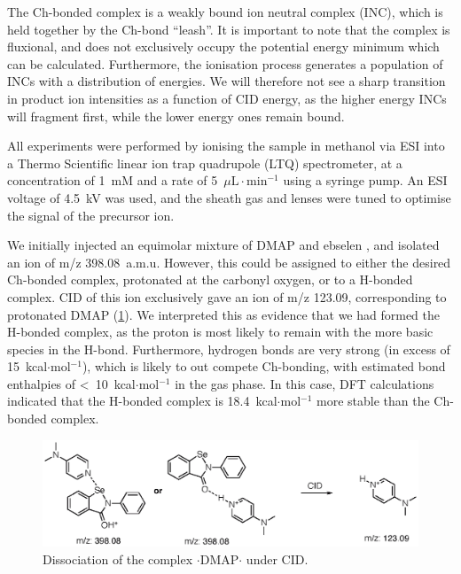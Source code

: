 \begin{refsection}
The Ch-bonded complex is a weakly bound ion neutral complex (INC), which is held together by the Ch-bond ``leash''.\autocite{McAdoo1993}
It is important to note that the complex is fluxional, and does not exclusively occupy the potential energy minimum which can be calculated.
Furthermore, the ionisation process generates a population of INCs with a distribution of energies.
We will therefore not see a sharp transition in product ion intensities as a function of CID energy, as the higher energy INCs will fragment first, while the lower energy ones remain bound.

All experiments were performed by ionising the sample in methanol via ESI into a Thermo Scientific linear ion trap quadrupole (LTQ) spectrometer, at a concentration of 1~m\textsc{M} and a rate of 5~$\mu\text{L}\cdot\text{min}^{-1}$ using a syringe pump.
An ESI voltage of 4.5~kV was used, and the sheath gas and lenses were tuned to optimise the signal of the precursor ion.

We initially injected an equimolar mixture of DMAP and ebselen , and isolated an ion of m/z 398.08~a.m.u.
However, this could be assigned to either the desired Ch-bonded complex, protonated at the carbonyl oxygen, or to a H-bonded complex.
CID of this ion exclusively gave an ion of m/z 123.09, corresponding to protonated DMAP (\cref{fig:pos-esi-ms}).
We interpreted this as evidence that we had formed the H-bonded complex, as the proton is most likely to remain with the more basic species in the H-bond.
Furthermore,  hydrogen bonds are very strong (in excess of 15~kcal$\cdot$mol$^{-1}$)\autocite{Emsley1980}, which is likely to out compete Ch-bonding, with estimated bond enthalpies of <~10~kcal$\cdot$mol$^{-1}$ in the gas phase.
In this case, DFT calculations indicated that the H-bonded complex is 18.4~kcal$\cdot$mol$^{-1}$ more stable than the Ch-bonded complex.


\begin{figure}
    \centering
    \includegraphics[scale=0.74]{Figures/pos-esi-ms.eps}
    \caption[Positive mode ESI of $ \cdot $DMAP$ \cdot $.]{Dissociation of the complex $ \cdot $DMAP$ \cdot $ under CID.}\label{fig:pos-esi-ms}
\end{figure}


\end{refsection}
